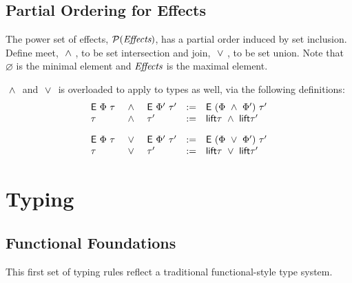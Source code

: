 \documentclass{article}
\begin{document}

\subsection{Partial Ordering for Effects}

The power set of effects, $\mathcal{P}(\textit{Effects})$,
has a partial order induced by set inclusion.
Define meet, $~ \land ~$, to be set intersection
and join, $~ \lor ~$, to be set union.
Note that $\varnothing$ is the minimal element and $\textit{Effects}$ is the maximal element.

$~ \land ~$ and $~ \lor ~$ is overloaded to apply to types as well,
via the following definitions:
\[ \begin{array}{lclcl}
  \textsf{E} ~ \Phi ~ \tau & ~ \land ~ & \textsf{E} ~ \Phi' ~ \tau'
                      & :=    & \textsf{E} ~ (\Phi ~ \land ~ \Phi') ~ \tau'
  \\
  \tau                & ~ \land ~ & \tau'
                      & :=    & \textsf{lift} \tau ~ \land ~ \textsf{lift} \tau'
  \\[1em]
  \textsf{E} ~ \Phi ~ \tau & ~ \lor ~ & \textsf{E} ~ \Phi' ~ \tau'
                      & :=    & \textsf{E} ~ (\Phi ~ \lor ~ \Phi') ~ \tau'
  \\
  \tau                & ~ \lor ~ & \tau'
                      & :=    & \textsf{lift} \tau ~ \lor ~ \textsf{lift} \tau'
 \end{array} \]

\newpage
\section{Typing}

\subsection{Functional Foundations}
This first set of typing rules reflect a traditional functional-style type system.
\end{document}
